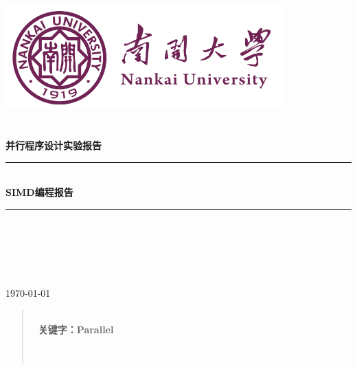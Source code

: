 \documentclass[UTF8,a4paper,10pt]{ctexart}
\newcommand{\sihao}{\fontsize{14pt}{21pt}\selectfont}            %
\newcommand{\HRule}{\rule{\linewidth}{0.5mm}}%
\begin{document}
\begin{titlepage}
    \begin{center}
    \includegraphics[width=0.8\textwidth]{NKU.png}\\[1cm]    
    \textsc{\Huge {} }\\[0.9cm]
    \textsc{\huge {}}\\[0.5cm]
    \textsc{\Large \textbf{并行程序设计实验报告}}\\[0.8cm]
    \HRule \\[0.9cm]
    { \LARGE \bfseries SIMD编程报告}\\[0.4cm]
    \HRule \\[2.0cm]
    \centering
    \textsc{\LARGE {}}\\[0.5cm]
    \textsc{\LARGE {}}\\[0.5cm]
    \textsc{\LARGE {}}\\[0.5cm]
    \textsc{\LARGE {}}\\[0.5cm]
    \vfill
    {\Large \today}
    \end{center}
\end{titlepage}
\newpage
\thispagestyle{empty}
\renewcommand{\abstractname}{\kaishu \sihao \textbf{摘要}}
\begin{abstract}
  
  \noindent  %
  \textbf{\\\ 关键字：Parallel}\textbf{} \\\ \\\
\end{abstract}
\tableofcontents
\clearpage

\section{}
\end{document}
